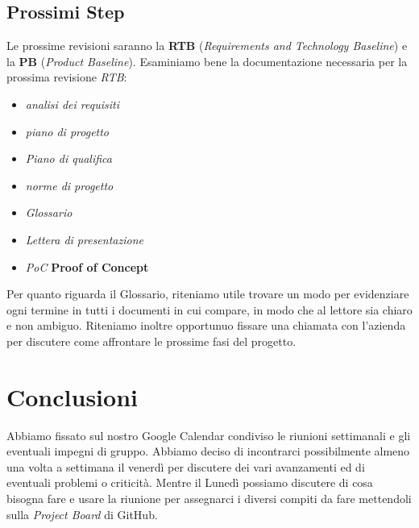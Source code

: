 \documentclass{article}
\begin{document}
\subsection{Prossimi Step}
Le prossime revisioni saranno la \textbf{RTB} (\textit{Requirements and Technology Baseline}) e la \textbf{PB} (\textit{Product Baseline}).
Esaminiamo bene la documentazione necessaria per la prossima revisione \emph{RTB}:
\begin{itemize}
    \item \textit{analisi dei requisiti}
    \item \textit{piano di progetto}
    \item \textit{Piano di qualifica}
    \item \textit{norme di progetto}
    \item \textit{Glossario}
    \item \textit{Lettera di presentazione}
    \item \emph{PoC} \textbf{Proof of Concept}
\end{itemize}
Per quanto riguarda il Glossario, riteniamo utile trovare un modo per evidenziare ogni termine in tutti i documenti in cui compare, in modo che al lettore sia chiaro e non ambiguo.
Riteniamo inoltre opportunuo fissare una chiamata con l'azienda per discutere come affrontare le prossime fasi del progetto.

\section{Conclusioni}
Abbiamo fissato sul nostro Google Calendar condiviso le riunioni settimanali e gli eventuali impegni di gruppo. Abbiamo deciso di incontrarci possibilmente almeno una volta a settimana il venerdì per discutere dei vari avanzamenti ed di eventuali problemi o criticità. Mentre il Lunedì possiamo discutere di cosa bisogna fare e usare la riunione per assegnarci i diversi compiti da fare mettendoli sulla \textit{Project Board} di GitHub.
\end{document}
